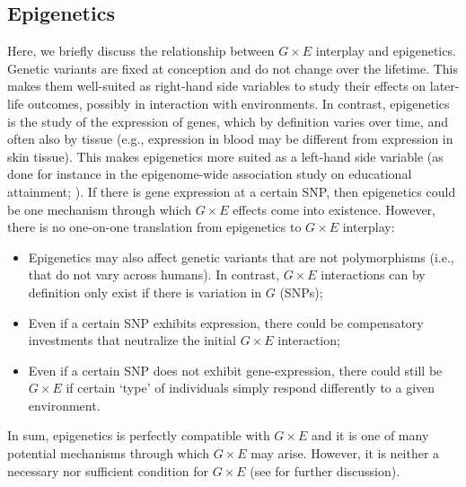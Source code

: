 \documentclass[12pt,a4paper]{article}
\begin{document}
\begin{bibunit}
\subsection{Epigenetics} \label{appsec:epi}
Here, we briefly discuss the relationship between $G \times E$ interplay and epigenetics. Genetic variants are fixed at conception and do not change over the lifetime. This makes them well-suited as right-hand side variables to study their effects on later-life outcomes, possibly in interaction with environments. In contrast, epigenetics is the study of the expression of genes, which by definition varies over time, and often also by tissue (e.g., expression in blood may be different from expression in skin tissue). This makes epigenetics more suited as a left-hand side variable (as done for instance in the epigenome-wide association study on educational attainment; \citet{karlsson2017epigenome}). If there is gene expression at a certain SNP, then epigenetics could be one mechanism through which $G \times E$ effects come into existence. However, there is no one-on-one translation from epigenetics to $G \times E$ interplay: 
    \begin{itemize}
    \item Epigenetics may also affect genetic variants that are not polymorphisms (i.e., that do not vary across humans). In contrast, $G \times E$ interactions can by definition only exist if there is variation in $G$ (SNPs);
    \item Even if a certain SNP exhibits expression, there could be compensatory investments that neutralize the initial $G \times E$ interaction;
    \item Even if a certain SNP does not exhibit gene-expression, there could still be $G \times E$ if certain `type' of individuals simply respond differently to a given environment.
    \end{itemize}
In sum, epigenetics is perfectly compatible with $G \times E$ and it is one of many potential mechanisms through which $G \times E$ may arise. However, it is neither a necessary nor sufficient condition for $G \times E$ (see \citet{baker2022beyond} for further discussion).  


\clearpage
\renewcommand{\thetable}{C.\arabic{table}}
\renewcommand{\thefigure}{C.\arabic{figure}}
\renewcommand{\theequation}{C.\arabic{equation}}
\setcounter{table}{0} 
\setcounter{figure}{0} 
\setcounter{equation}{0} 


\end{bibunit}
\end{document}
